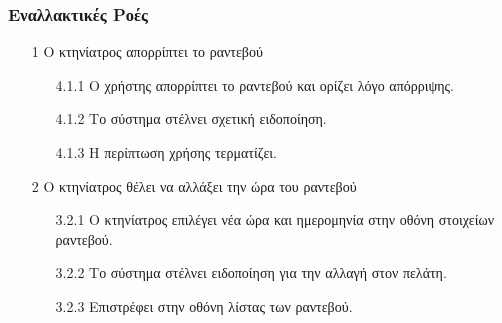 \documentclass[12pt,a4paper,twoside]{book}
\begin{document}
\subsubsection{Εναλλακτικές Ροές}
\begin{enumerate}
  \item[1 ] Ο κτηνίατρος απορρίπτει το ραντεβού
        \begin{enumerate}
          \item[4.1.1 ] Ο χρήστης απορρίπτει το ραντεβού και ορίζει λόγο απόρριψης. %
          \item[4.1.2 ] Το σύστημα στέλνει σχετική ειδοποίηση. %
          \item[4.1.3 ] Η περίπτωση χρήσης τερματίζει.
        \end{enumerate}
  \item[2 ] Ο κτηνίατρος θέλει να αλλάξει την ώρα του ραντεβού
        \begin{enumerate}
          \item[3.2.1 ] Ο κτηνίατρος επιλέγει νέα ώρα και ημερομηνία στην οθόνη στοιχείων ραντεβού.
          \item[3.2.2 ] Το σύστημα στέλνει ειδοποίηση για την αλλαγή στον πελάτη. %
          \item[3.2.3 ] Επιστρέφει στην οθόνη λίστας των ραντεβού.
        \end{enumerate}

\end{enumerate}
\end{document}
